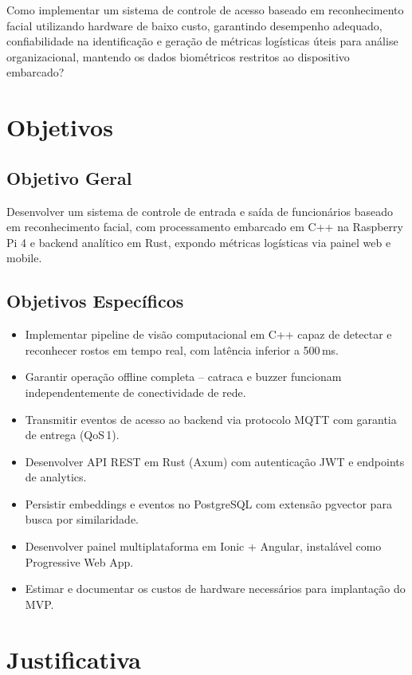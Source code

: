 \documentclass[12pt,a4paper]{report}
\begin{document}
Como implementar um sistema de controle de acesso baseado em reconhecimento facial utilizando hardware de baixo custo, garantindo desempenho adequado, confiabilidade na identificação e geração de métricas logísticas úteis para análise organizacional, mantendo os dados biométricos restritos ao dispositivo embarcado?

\section{Objetivos}

\subsection{Objetivo Geral}

Desenvolver um sistema de controle de entrada e saída de funcionários baseado em reconhecimento facial, com processamento embarcado em C++ na Raspberry Pi 4 e backend analítico em Rust, expondo métricas logísticas via painel web e mobile.

\subsection{Objetivos Específicos}
\label{sec:objetivos-especificos}

\begin{itemize}
    \item Implementar pipeline de visão computacional em C++ capaz de detectar e reconhecer rostos em tempo real, com latência inferior a 500\,ms.
    \item Garantir operação offline completa -- catraca e buzzer funcionam independentemente de conectividade de rede.
    \item Transmitir eventos de acesso ao backend via protocolo MQTT com garantia de entrega (QoS\,1).
    \item Desenvolver API REST em Rust (Axum) com autenticação JWT e endpoints de analytics.
    \item Persistir embeddings e eventos no PostgreSQL com extensão pgvector para busca por similaridade.
    \item Desenvolver painel multiplataforma em Ionic + Angular, instalável como Progressive Web App.
    \item Estimar e documentar os custos de hardware necessários para implantação do MVP.
\end{itemize}

\section{Justificativa}
\end{document}
